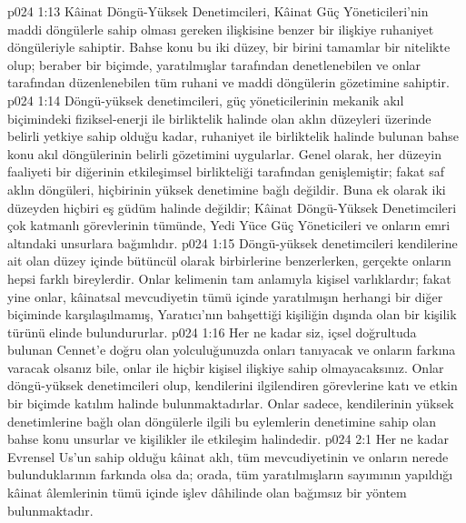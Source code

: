 \vs p024 1:13 Kâinat Döngü\hyp{}Yüksek Denetimcileri, Kâinat Güç Yöneticileri’nin maddi döngülerle sahip olması gereken ilişkisine benzer bir ilişkiye ruhaniyet döngüleriyle sahiptir. Bahse konu bu iki düzey, bir birini tamamlar bir nitelikte olup; beraber bir biçimde, yaratılmışlar tarafından denetlenebilen ve onlar tarafından düzenlenebilen tüm ruhani ve maddi döngülerin gözetimine sahiptir.
\vs p024 1:14 Döngü\hyp{}yüksek denetimcileri, güç yöneticilerinin mekanik akıl biçimindeki fiziksel\hyp{}enerji ile birliktelik halinde olan aklın düzeyleri üzerinde belirli yetkiye sahip olduğu kadar, ruhaniyet ile birliktelik halinde bulunan bahse konu akıl döngülerinin belirli gözetimini uygularlar. Genel olarak, her düzeyin faaliyeti bir diğerinin etkileşimsel birlikteliği tarafından genişlemiştir; fakat saf aklın döngüleri, hiçbirinin yüksek denetimine bağlı değildir. Buna ek olarak iki düzeyden hiçbiri eş güdüm halinde değildir; Kâinat Döngü\hyp{}Yüksek Denetimcileri çok katmanlı görevlerinin tümünde, Yedi Yüce Güç Yöneticileri ve onların emri altındaki unsurlara bağımlıdır.
\vs p024 1:15 Döngü\hyp{}yüksek denetimcileri kendilerine ait olan düzey içinde bütüncül olarak birbirlerine benzerlerken, gerçekte onların hepsi farklı bireylerdir. Onlar kelimenin tam anlamıyla kişisel varlıklardır; fakat yine onlar, kâinatsal mevcudiyetin tümü içinde yaratılmışın herhangi bir diğer biçiminde karşılaşılmamış, Yaratıcı’nın bahşettiği kişiliğin dışında olan bir kişilik türünü elinde bulundururlar.
\vs p024 1:16 Her ne kadar siz, içsel doğrultuda bulunan Cennet’e doğru olan yolculuğunuzda onları tanıyacak ve onların farkına varacak olsanız bile, onlar ile hiçbir kişisel ilişkiye sahip olmayacaksınız. Onlar döngü\hyp{}yüksek denetimcileri olup, kendilerini ilgilendiren görevlerine katı ve etkin bir biçimde katılım halinde bulunmaktadırlar. Onlar sadece, kendilerinin yüksek denetimlerine bağlı olan döngülerle ilgili bu eylemlerin denetimine sahip olan bahse konu unsurlar ve kişilikler ile etkileşim halindedir.
\vs p024 2:1 Her ne kadar Evrensel Us’un sahip olduğu kâinat aklı, tüm  mevcudiyetinin ve onların nerede bulunduklarının farkında olsa da; orada, tüm  yaratılmışların sayımının yapıldığı kâinat âlemlerinin tümü içinde işlev dâhilinde olan bağımsız bir yöntem bulunmaktadır.
